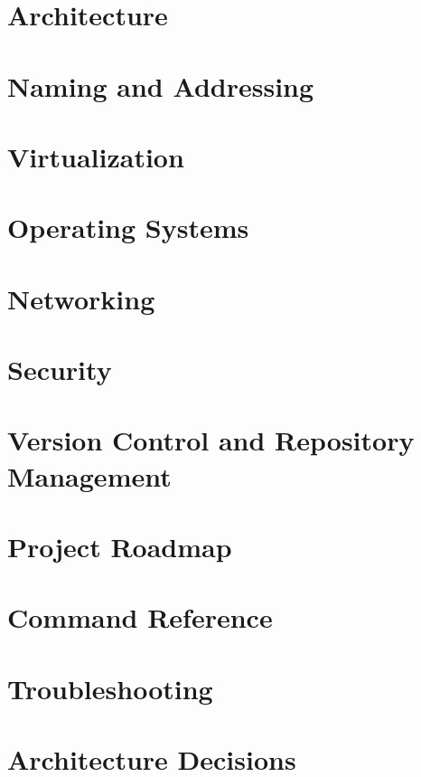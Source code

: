 \documentclass[12pt,a4paper]{report}
\begin{document}
\chapter{Architecture}


\chapter{Naming and Addressing}


\chapter{Virtualization}


\chapter{Operating Systems}


\chapter{Networking}


\chapter{Security}


\chapter{Version Control and Repository Management}


\chapter{Project Roadmap}



\appendix

\chapter{Command Reference}


\chapter{Troubleshooting}


\chapter{Architecture Decisions}

\end{document}
